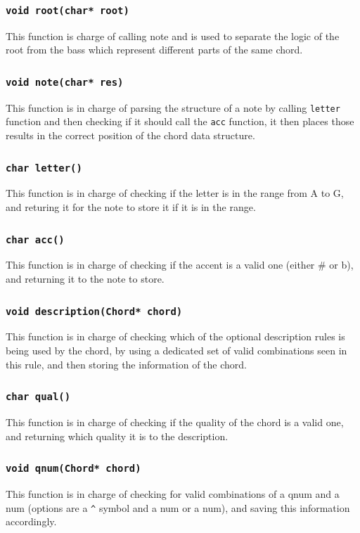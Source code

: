 \documentclass{article}
\begin{document}
\subsubsection{\texttt{void root(char* root)}}
This function is charge of calling note and is used to separate the logic of the root from the bass which represent different parts of the same chord. 
\subsubsection{\texttt{void note(char* res)}}
This function is in charge of parsing the structure of a note by calling \texttt{letter} function and then checking if it should call the \texttt{acc} function, it then places those results in the correct position of the chord data structure.
\subsubsection{\texttt{char letter()}}
This function is in charge of checking if the letter is in the range from A to G, and returing it for the note to store it if it is in the range.
\subsubsection{\texttt{char acc()}}
This function is in charge of checking if the accent is a valid one (either \# or b), and returning it to the note to store.
\subsubsection{\texttt{void description(Chord* chord)}}
This function is in charge of checking which of the optional description rules is being used by the chord, by using a dedicated set of valid combinations seen in this rule, and then storing the information of the chord.
\subsubsection{\texttt{char qual()}}
This function is in charge of checking if the quality of the chord is a valid one, and returning which quality it is to the description.
\subsubsection{\texttt{void qnum(Chord* chord)}}
This function is in charge of checking for valid combinations of a qnum and a num (options are a \texttt{\^{}} symbol and a num or a num), and saving this information accordingly.
\end{document}
